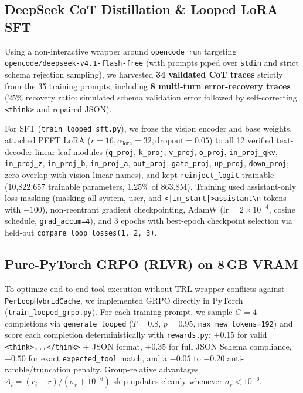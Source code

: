 \documentclass[10pt,letterpaper]{article}
\begin{document}
\subsection{DeepSeek CoT Distillation \& Looped LoRA SFT}
Using a non-interactive wrapper around \texttt{opencode run} targeting \texttt{opencode/deepseek-v4.1-flash-free} (with prompts piped over \texttt{stdin} and strict schema rejection sampling), we harvested \textbf{34 validated CoT traces} strictly from the 35 training prompts, including \textbf{8 multi-turn error-recovery traces} (25\% recovery ratio: simulated schema validation error followed by self-correcting \texttt{<think>} and repaired JSON).

For SFT (\texttt{train\_looped\_sft.py}), we froze the vision encoder and base weights, attached PEFT LoRA \cite{lora} ($r=16, \alpha_{\text{lora}}=32, \text{dropout}=0.05$) to all 12 verified text-decoder linear leaf modules (\texttt{q\_proj}, \texttt{k\_proj}, \texttt{v\_proj}, \texttt{o\_proj}, \texttt{in\_proj\_qkv}, \texttt{in\_proj\_z}, \texttt{in\_proj\_b}, \texttt{in\_proj\_a}, \texttt{out\_proj}, \texttt{gate\_proj}, \texttt{up\_proj}, \texttt{down\_proj}; zero overlap with vision linear names), and kept \texttt{reinject\_logit} trainable (10,822,657 trainable parameters, 1.25\% of 863.8M). Training used assistant-only loss masking (masking all system, user, and \texttt{<|im\_start|>assistant\textbackslash n} tokens with $-100$), non-reentrant gradient checkpointing, AdamW ($\text{lr}=2\times10^{-4}$, cosine schedule, \texttt{grad\_accum=4}), and 3 epochs with best-epoch checkpoint selection via held-out \texttt{compare\_loop\_losses(1, 2, 3)}.

\subsection{Pure-PyTorch GRPO (RLVR) on 8\,GB VRAM}
To optimize end-to-end tool execution without TRL wrapper conflicts against \texttt{PerLoopHybridCache}, we implemented GRPO \cite{deepseekr1} directly in PyTorch (\texttt{train\_looped\_grpo.py}). For each training prompt, we sample $G=4$ completions via \texttt{generate\_looped} ($T=0.8$, $p=0.95$, \texttt{max\_new\_tokens=192}) and score each completion deterministically with \texttt{rewards.py}: $+0.15$ for valid \texttt{<think>...</think>} + JSON format, $+0.35$ for full JSON Schema compliance, $+0.50$ for exact \texttt{expected\_tool} match, and a $-0.05$ to $-0.20$ anti-ramble/truncation penalty. Group-relative advantages $A_i = (r_i - \bar{r}) / (\sigma_r + 10^{-6})$ skip updates cleanly whenever $\sigma_r < 10^{-6}$.
\end{document}
